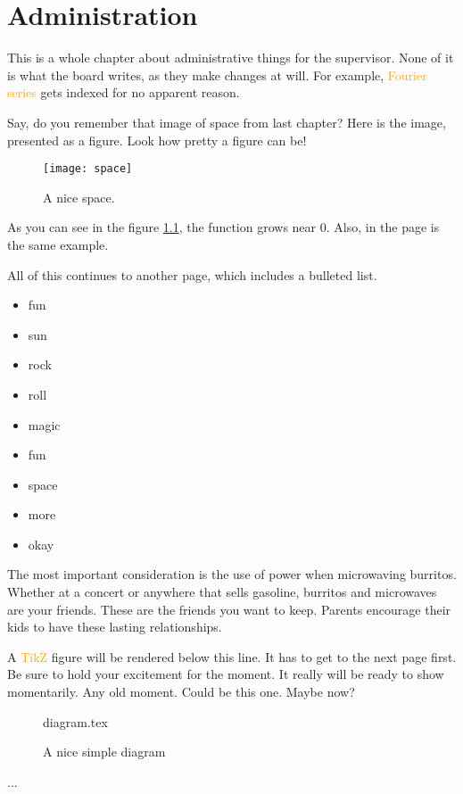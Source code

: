 \documentclass[float=false, crop=false]{standalone}
\begin{document}
\chapter{Administration}
This is a whole chapter about administrative things for the supervisor. None of it is what the board writes, as they make changes at will. For example, \textcolor{orange}{Fourier series}
 gets indexed for no apparent reason.

Say, do you remember that image of space from last chapter? Here is the image, presented as a figure. Look how pretty a figure can be!
\begin{figure}[h]
    \centering
    \texttt{[image: space]}
    \caption{A nice space.}
    \label{fig:space1}
\end{figure}
 
As you can see in the figure \ref{fig:space1}, the 
function grows near 0. Also, in the page \pageref{fig:space1} 
is the same example.
 
All of this continues to another page, which includes a bulleted list.
\begin{itemize}
\item fun
\item sun 
\item rock
\item roll
\item magic
\item fun
\item space
\item more
\item okay
\end{itemize}


The most important consideration is the use of power when microwaving burritos. Whether at a concert or anywhere that sells gasoline, burritos and microwaves are your friends. These are the friends you want to keep. Parents encourage their kids to have these lasting relationships. 

A \textcolor{orange}{TikZ}
 figure will be rendered below this line. It has to get to the next page first. Be sure to hold your excitement for the moment. It really will be ready to show momentarily. Any old moment. Could be this one. Maybe now? 
 \begin{figure}[ht]
 {diagram.tex}
 \label{fig:tikzexample}
\caption{A nice simple diagram}
\end{figure}
 ...
\end{document}
